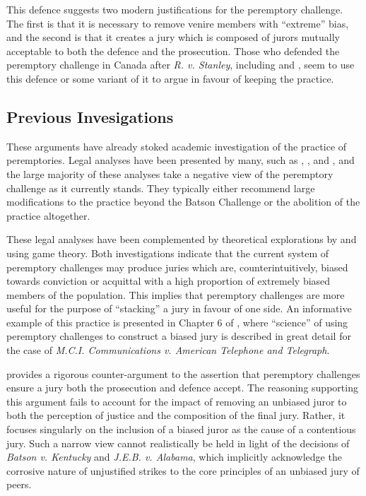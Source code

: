 This defence suggests two modern justifications for the peremptory challenge. The first is that it is necessary to remove venire members with
``extreme'' bias, and the second is that it creates a jury which is composed of jurors mutually acceptable to both the defence and
the prosecution. Those who defended the peremptory
challenge in Canada after \textit{R. v. Stanley}, including
\cite{peremparegood} and \cite{macnabproper}, seem to use this defence or some variant of it to argue in favour of keeping the
practice.

\subsection{Previous Invesigations} \label{sec:prevwork}

These arguments have already stoked academic investigation of the practice of peremptories. Legal analyses have been
presented by many, such as \cite{hoffman1997}, \cite{broderick1992}, and \cite{Nunn1993}, and the large majority of these
analyses take a negative view of the peremptory challenge as it currently stands. They typically either recommend large
modifications to the practice beyond the Batson Challenge or the abolition of the practice altogether.

These legal analyses have been complemented by theoretical explorations by \cite{ford2010} and \cite{flanagan2015} using game
theory. Both investigations indicate that the current system of peremptory challenges may produce juries which are, counterintuitively, biased
towards conviction or acquittal with a high proportion of extremely biased members of the population. This implies that peremptory challenges are more useful for the purpose of ``stacking'' a jury in favour of one side. An informative example of this practice is presented in  Chapter 6 of \cite{hansvidjudging}, where ``science'' of using peremptory challenges to construct a biased jury is described in great detail for the case of \textit{M.C.I. Communications v. American Telephone and Telegraph}.

\cite{hoffman1997} provides a rigorous counter-argument to the assertion that peremptory challenges ensure a jury both the prosecution and defence accept. The reasoning supporting this argument fails to account for the
impact of removing an unbiased juror to both the perception of justice and the composition of the final jury. Rather, it focuses
singularly on the inclusion of a biased juror as the cause of a contentious jury. Such a narrow view cannot
realistically be held in light of the decisions of \textit{Batson v. Kentucky} and \textit{J.E.B. v. Alabama}, which implicitly
acknowledge the corrosive nature of unjustified strikes to the core principles of an unbiased jury of peers.

